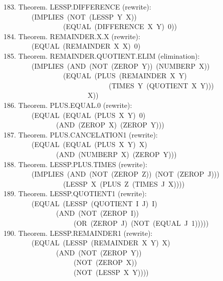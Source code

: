 \documentclass[10pt]{book}
\newenvironment{pubasis}{\begin{flushleft}}{\end{flushleft}}
\begin{document}
\begin{pubasis}
183.    Theorem.  LESSP.DIFFERENCE (rewrite):\\
~~~~~~~~(IMPLIES~(NOT~(LESSP~Y~X))\\
~~~~~~~~~~~~~~~~~(EQUAL~(DIFFERENCE~X~Y)~0))\\

184.    Theorem.  REMAINDER.X.X (rewrite):\\
~~~~~~~~(EQUAL~(REMAINDER~X~X)~0)\\

185.    Theorem.  REMAINDER.QUOTIENT.ELIM (elimination):\\
~~~~~~~~(IMPLIES~(AND~(NOT~(ZEROP~Y))~(NUMBERP~X))\\
~~~~~~~~~~~~~~~~~(EQUAL~(PLUS~(REMAINDER~X~Y)\\
~~~~~~~~~~~~~~~~~~~~~~~~~~~~~~(TIMES~Y~(QUOTIENT~X~Y)))\\
~~~~~~~~~~~~~~~~~~~~~~~~X))\\

186.    Theorem.  PLUS.EQUAL.0 (rewrite):\\
~~~~~~~~(EQUAL~(EQUAL~(PLUS~X~Y)~0)\\
~~~~~~~~~~~~~~~(AND~(ZEROP~X)~(ZEROP~Y)))\\

187.    Theorem.  PLUS.CANCELATION1 (rewrite):\\
~~~~~~~~(EQUAL~(EQUAL~(PLUS~X~Y)~X)\\
~~~~~~~~~~~~~~~(AND~(NUMBERP~X)~(ZEROP~Y)))\\

188.    Theorem.  LESSP.PLUS.TIMES (rewrite):\\
~~~~~~~~(IMPLIES~(AND~(NOT~(ZEROP~Z))~(NOT~(ZEROP~J)))\\
~~~~~~~~~~~~~~~~~(LESSP~X~(PLUS~Z~(TIMES~J~X))))\\

189.    Theorem.  LESSP.QUOTIENT1 (rewrite):\\
~~~~~~~~(EQUAL~(LESSP~(QUOTIENT~I~J)~I)\\
~~~~~~~~~~~~~~~(AND~(NOT~(ZEROP~I))\\
~~~~~~~~~~~~~~~~~~~~(OR~(ZEROP~J)~(NOT~(EQUAL~J~1)))))\\

190.    Theorem.  LESSP.REMAINDER1 (rewrite):\\
~~~~~~~~(EQUAL~(LESSP~(REMAINDER~X~Y)~X)\\
~~~~~~~~~~~~~~~(AND~(NOT~(ZEROP~Y))\\
~~~~~~~~~~~~~~~~~~~~(NOT~(ZEROP~X))\\
~~~~~~~~~~~~~~~~~~~~(NOT~(LESSP~X~Y))))\\


\end{pubasis}
\end{document}
